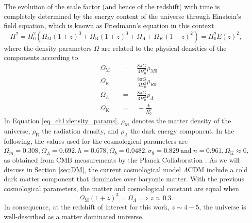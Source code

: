 The evolution of the scale factor (and hence of the redshift) with time is completely determined by the energy content of the universe through Einstein's field equation, which is known as Friedmann's equation in this context
\begin{equation}
    H^2=H_0^2\left( \Omega_\text{M} (1+z)^3+\Omega_\text{R} (1+z)^3 +\Omega_\Lambda + \Omega_K (1+z)^2 \right)=H_0^2E(z)^2,
\end{equation}
where the density parameters $\Omega$ are related to the physical densities of the components according to
\begin{equation}\label{eq_ch1:density_params}
    \begin{aligned}&\Omega_\text{M}&&=\quad\frac{8\pi G}{3H_0^2}\rho_{M0}\\&\Omega_\text{R}&&=\quad\frac{8\pi G}{3H_0^2}\rho_{R0}\\&\Omega_{\Lambda}&&=\quad\frac{8\pi G}{3H_0^2}\rho_{\Lambda}\\&\Omega_\text{K}&&=\quad-\frac k{H_0^2}\end{aligned}
\end{equation}
In Equation \ref{eq_ch1:density_params}, $\rho_\text{M}$ denotes the matter density of the universe, $\rho_\text{R}$ the radiation density, and $\rho_\Lambda$ the dark energy component. In the following, the values used for the cosmological parameters are $\Omega_m=0.308,\Omega_\Lambda=0.692,h=0.678,\Omega_b=0.0482,\sigma_8=0.829\mathrm{~and~}n=0.961, \Omega_\text{K}\approx 0$, as obtained from CMB measurements by the Planck Collaboration \cite{planck2014}. As we will discuss in Section \ref{sec:DM}, the current cosmological model $\Lambda$CDM include a cold dark matter component that dominates over baryonic matter. With the previous cosmological parameters, the matter and cosmological constant are equal when
\begin{equation}
    \Omega_\text{M}(1+z)^3=\Omega_\Lambda \implies z\approx 0.3.
\end{equation}
In consequence, at the redshift of interest for this work, $z\sim 4-5$, the universe is well-described as a matter dominated universe.








